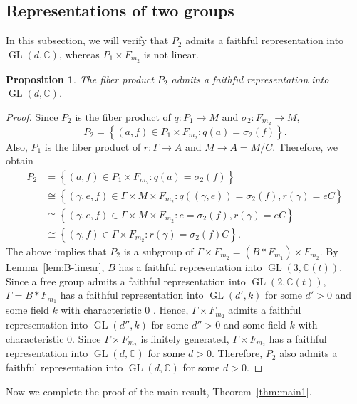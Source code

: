 \documentclass[11pt]{amsart}
\newtheorem{prop}[thm]{Proposition}
\theoremstyle{definition}
\DeclareMathOperator{\GL}{GL}
\newcommand{\CC}{\mathbb{C}}
\begin{document}
\subsection{Representations of two groups}

 In this subsection, we will verify that $P_2$ admits a faithful representation into $\GL(d,\CC)$, whereas $P_1 \times F_{m_2}$ is not linear.

 \begin{prop}
 The fiber product $P_2$ admits a faithful representation into $\GL(d,\CC)$.
 \end{prop}
 \begin{proof}
 Since $P_2$ is the fiber product of $q: P_1 \to M$ and $\sigma_2:F_{m_2} \to M$, $$P_2=\left \{ (a,f) \in P_1 \times F_{m_2} : q(a)=\sigma_2(f) \right \}. $$
 Also, $P_1$ is the fiber product of $r:\Gamma \to A$ and $M \to A=M/C$.
 Therefore, we obtain
 \begin{align*}
 P_2 &= \left \{ (a,f) \in P_1 \times F_{m_2} : q(a)=\sigma_2(f) \right \} \\
 &\cong \left \{ (\gamma,e,f) \in \Gamma \times M \times F_{m_2} : q((\gamma,e))=\sigma_2(f), r(\gamma)=eC \right \} \\
 &\cong \left \{ (\gamma,e,f) \in \Gamma \times M \times F_{m_2} : e=\sigma_2(f), r(\gamma)=eC \right \}  \\
 &\cong \left \{ (\gamma,f) \in \Gamma \times F_{m_2}:r(\gamma)=\sigma_2(f)C  \right \}.
 \end{align*}
 The above implies that $P_2$ is a subgroup of $\Gamma \times F_{m_2} = (B*F_{m_1}) \times F_{m_2}$.
 By Lemma~\ref{lem:B-linear}, $B$ has a faithful representation into $\GL(3,\CC(t))$.
 Since a free group admits a faithful representation into $\GL(2,\CC(t))$,
 $\Gamma=B*F_{m_1}$ has a faithful representation into $\GL(d',k)$ for some $d'>0$ and some field $k$ with characteristic $0$ \cite{minty1997faithful}.
 Hence, $\Gamma \times F_{m_2}$ admits a faithful representation into $\GL(d'',k)$ for some $d''>0$ and some field $k$ with characteristic $0$.
 Since $\Gamma \times F_{m_2}$ is finitely generated, $\Gamma \times F_{m_2}$ has a faithful representation into $\GL(d,\CC)$ for some $d>0$.
 Therefore, $P_2$ also admits a faithful representation into $\GL(d,\CC)$ for some $d>0$.
 \end{proof}

 Now we complete the proof of the main result, Theorem~\ref{thm:main1}.
\end{document}
